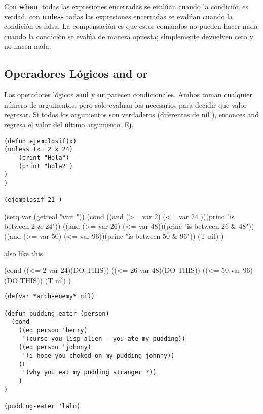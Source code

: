 \documentclass[11pt]{article}
\begin{document}
Con \textbf{when}, todas las expresiones encerradas se evalúan cuando la
condición es verdad, con \textbf{unless} todas las expresiones encerradas se
evalúan cuando la condición es falsa. La compensación es que estos
comandos no pueden hacer nada cuando la condición se evalúa de manera
opuesta; simplemente devuelven cero y no hacen nada.


\subsection*{Operadores Lógicos and or}
\label{sec:org35a7bad}

Los operadores lógicos \textbf{and} y \textbf{or} parecen condicionales. Ambos toman
cualquier número de argumentos, pero solo evaluan los necesarios
para decidir que valor regresar. Si todos los argumentos son
verdaderos (diferentes de nil ), entonces and regresa el valor del
último argumento. Ej.


\begin{verbatim}
(defun ejemplosif(x)
(unless (<= 2 x 24)
	(print "Hola")
	(print "hola2")
)
)

(ejemplosif 21 )

\end{verbatim}


(setq var (getreal "\nEnter var: "))
(cond
  ((and (>= var 2) (<= var 24 ))(princ "\nvar is between 2 \& 24"))
  ((and (>= var 26) (<= var 48))(princ "\nvar is between 26 \& 48"))
  ((and (>= var 50) (<= var 96))(princ "\nvar is between 50 \& 96"))
  (T nil)
  )

also like this

(cond
  ((<= 2 var 24)(DO THIS))
  ((<= 26 var 48)(DO THIS))
  ((<= 50 var 96)(DO THIS))
  (T nil)
  )


\begin{verbatim}
(defvar *arch-enemy* nil)

(defun pudding-eater (person)
  (cond 
	((eq person 'henry) 
	 '(curse you lisp alien – you ate my pudding))
	((eq person 'johnny) 
	 '(i hope you choked on my pudding johnny))
	(t
	 '(why you eat my pudding stranger ?))
	)
)

(pudding-eater 'lalo)

\end{verbatim}
\end{document}
